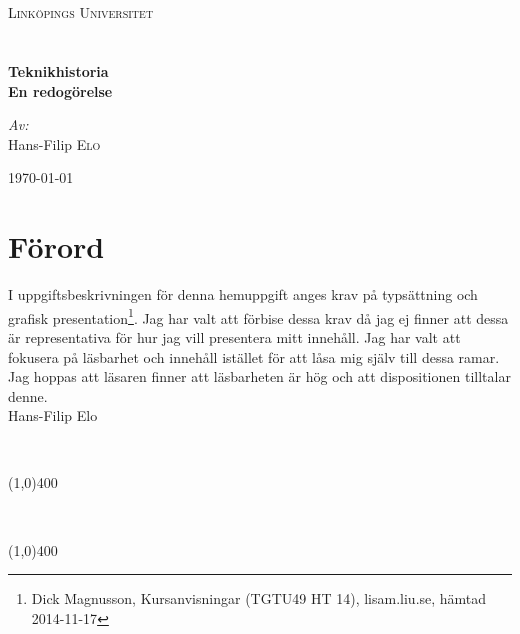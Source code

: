 \documentclass[a4paper,12pt,fleqn]{article}
\begin{document}
\begin{titlepage}
\begin{center}


~\\
~\\
\textsc{\LARGE Link{\"o}pings Universitet}\\[1.5cm]


~\\
~\\
{ \huge \bfseries Teknikhistoria \\ En redogörelse \\[0.4cm] }

\large
\emph{Av:}\\
Hans-Filip \textsc{Elo}

\vfill

{\large \today}

\end{center}


\newpage

\section*{Förord}

I uppgiftsbeskrivningen för denna hemuppgift anges krav på typsättning och grafisk presentation\footnote{Dick Magnusson, Kursanvisningar (TGTU49 HT 14), lisam.liu.se, hämtad 2014-11-17}. Jag har valt att förbise dessa krav då jag ej finner att dessa är representativa för hur jag vill presentera mitt innehåll. Jag har valt att fokusera på läsbarhet och innehåll istället för att låsa mig själv till dessa ramar. Jag hoppas att läsaren finner att läsbarheten är hög och att dispositionen tilltalar denne. 
~\\

Hans-Filip Elo

\newpage
\thispagestyle{empty}
\tableofcontents
~\\

\begin{center}
\line(1,0){400}
\end{center}

\listoffigures
~\\

\begin{center}
\line(1,0){400}
\end{center}

\listoftables

\end{titlepage}
\end{document}
